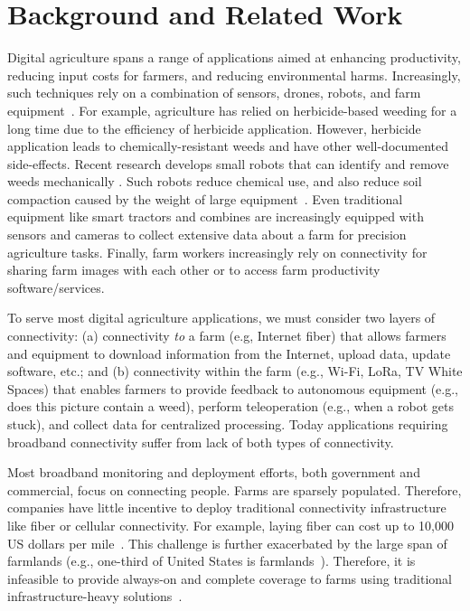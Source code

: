 \section{Background and Related Work}\label{sec:background}

Digital agriculture spans a range of applications aimed at enhancing productivity, reducing input costs for farmers, and reducing environmental harms. Increasingly, such techniques rely on a combination of sensors, drones, robots, and farm equipment~\cite{farmbeats}. For example, agriculture has relied on herbicide-based weeding for a long time due to the efficiency of herbicide application. However, herbicide application leads to chemically-resistant weeds and have other well-documented side-effects. Recent research develops small robots that can identify and remove weeds mechanically \cite{weeding_bots, weeding_bots2, naio_oz, reiser_development_2019}. Such robots reduce chemical use, and also reduce soil compaction caused by the weight of large equipment~\cite{uyeh2021evolutionary,van2022glyphosate}. Even traditional equipment like smart tractors and combines are increasingly equipped with sensors and cameras to collect extensive data about a farm for precision agriculture tasks. Finally, farm workers increasingly rely on connectivity for sharing farm images with each other or to access farm productivity software/services.

To serve most digital agriculture applications, we must consider two layers of connectivity: (a) connectivity \textit{to} a farm (e.g, Internet fiber) that allows farmers and equipment to download information from the Internet, upload data, update software, etc.; and (b) connectivity within the farm (e.g., Wi-Fi, LoRa, TV White Spaces) that enables farmers to provide feedback to autonomous equipment (e.g., does this picture contain a weed), perform teleoperation (e.g., when a robot gets stuck), and collect data for centralized processing. Today applications requiring broadband connectivity suffer from lack of both types of connectivity.

Most broadband monitoring and deployment efforts, both government and commercial, focus on connecting people. Farms are sparsely populated. Therefore, companies have little incentive to deploy traditional connectivity infrastructure like fiber or cellular connectivity. For example, laying fiber can cost up to 10,000 US dollars per mile~\cite{ifn_cost}. This challenge is further exacerbated by the large span of farmlands (e.g., one-third of United States is farmlands~\cite{agcensus}). Therefore, it is infeasible to provide always-on and complete coverage to farms using traditional infrastructure-heavy solutions~\cite{ifn_cost,usb_report}. 

